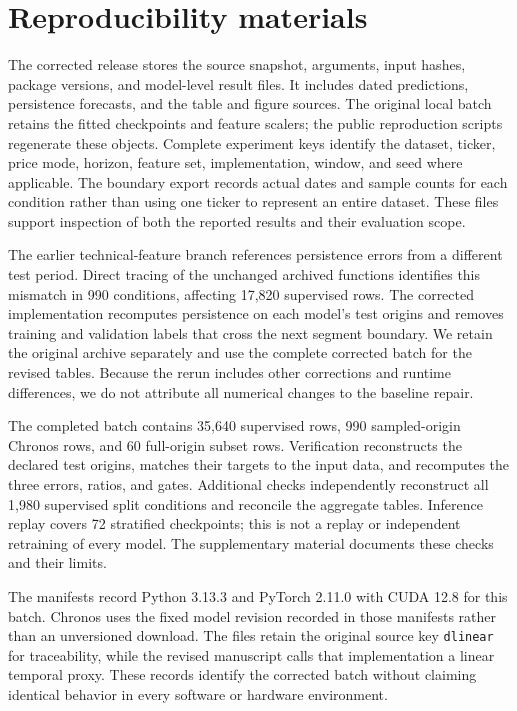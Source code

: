 \section{Reproducibility materials}

The corrected release stores the source snapshot, arguments, input hashes, package versions, and model-level result files. It includes dated predictions, persistence forecasts, and the table and figure sources. The original local batch retains the fitted checkpoints and feature scalers; the public reproduction scripts regenerate these objects. Complete experiment keys identify the dataset, ticker, price mode, horizon, feature set, implementation, window, and seed where applicable. The boundary export records actual dates and sample counts for each condition rather than using one ticker to represent an entire dataset. These files support inspection of both the reported results and their evaluation scope.

The earlier technical-feature branch references persistence errors from a different test period. Direct tracing of the unchanged archived functions identifies this mismatch in 990 conditions, affecting 17,820 supervised rows. The corrected implementation recomputes persistence on each model's test origins and removes training and validation labels that cross the next segment boundary. We retain the original archive separately and use the complete corrected batch for the revised tables. Because the rerun includes other corrections and runtime differences, we do not attribute all numerical changes to the baseline repair.

The completed batch contains 35,640 supervised rows, 990 sampled-origin Chronos rows, and 60 full-origin subset rows. Verification reconstructs the declared test origins, matches their targets to the input data, and recomputes the three errors, ratios, and gates. Additional checks independently reconstruct all 1,980 supervised split conditions and reconcile the aggregate tables. Inference replay covers 72 stratified checkpoints; this is not a replay or independent retraining of every model. The supplementary material documents these checks and their limits.

The manifests record Python 3.13.3 and PyTorch 2.11.0 with CUDA 12.8 for this batch. Chronos uses the fixed model revision recorded in those manifests rather than an unversioned download. The files retain the original source key \texttt{dlinear} for traceability, while the revised manuscript calls that implementation a linear temporal proxy. These records identify the corrected batch without claiming identical behavior in every software or hardware environment.
